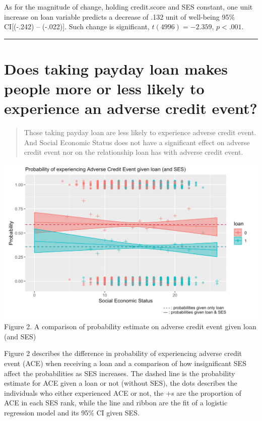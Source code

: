 \documentclass[]{article}
\begin{document}
As for the magnitude of change, holding credit.score and SES constant,
one unit increase on loan variable predicts a decrease of .132 unit of
well-being 95\% CI{[}(-.242) -- (-.022){]}. Such change is significant,
\(t(4996) = -2.359\), \(p < .001\).

\begin{center}\rule{0.5\linewidth}{\linethickness}\end{center}

\hypertarget{does-taking-payday-loan-makes-people-more-or-less-likely-to-experience-an-adverse-credit-event}{%
\section{Does taking payday loan makes people more or less likely to
experience an adverse credit
event?}\label{does-taking-payday-loan-makes-people-more-or-less-likely-to-experience-an-adverse-credit-event}}

\begin{quote}
Those taking payday loan are less likely to experience adverse credit
event. And Social Economic Status does not have a significant effect on
adverse credit event nor on the relationship loan has with adverse
credit event.
\end{quote}

\includegraphics{figure-2.png} Figure 2. A comparison of probability
estimate on adverse credit event given loan (and SES)

Figure 2 describes the difference in probability of experiencing adverse
credit event (ACE) when receiving a loan and a comparison of how
insignificant SES affect the probabilities as SES increases. The dashed
line is the probability estimate for ACE given a loan or not (without
SES), the dots describes the individuals who either experienced ACE or
not, the +s are the proportion of ACE in each SES rank, while the line
and ribbon are the fit of a logistic regression model and its 95\% CI
given SES.
\end{document}
